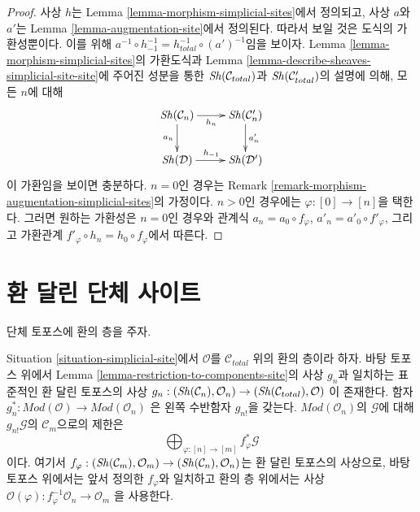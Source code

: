 \begin{proof}
사상 $h$는 Lemma \ref{lemma-morphism-simplicial-sites}에서 정의되고,
사상 $a$와 $a'$는 Lemma \ref{lemma-augmentation-site}에서 정의된다.
따라서 보일 것은 도식의 가환성뿐이다. 이를 위해
$a^{-1} \circ h_{-1}^{-1} = h_{total}^{-1} \circ (a')^{-1}$임을 보이자.
Lemma \ref{lemma-morphism-simplicial-sites}의 가환도식과 Lemma
\ref{lemma-describe-sheaves-simplicial-site-site}에 주어진 성분을 통한
$\mathop{\mathit{Sh}}\nolimits(\mathcal{C}_{total})$과 $\mathop{\mathit{Sh}}\nolimits(\mathcal{C}'_{total})$의 설명에 의해,
모든 $n$에 대해
$$
\xymatrix{
\Sh(\mathcal{C}_n) \ar[d]_{a_n} \ar[r]_{h_n} &
\Sh(\mathcal{C}'_n) \ar[d]^{a'_n} \\
\Sh(\mathcal{D}) \ar[r]^{h_{-1}} &
\Sh(\mathcal{D}')
}
$$
이 가환임을 보이면 충분하다. $n = 0$인 경우는 Remark
\ref{remark-morphism-augmentation-simplicial-sites}의 가정이다.
$n > 0$인 경우에는 $\varphi : [0] \to [n]$을 택한다. 그러면 원하는 가환성은
$n = 0$인 경우와 관계식 $a_n = a_0 \circ f_\varphi$,
$a'_n = a'_0 \circ f'_\varphi$, 그리고 가환관계
$f'_\varphi \circ h_n = h_0 \circ f_\varphi$에서 따른다.
\end{proof}


\section{환 달린 단체 사이트}
\label{section-simplicial-sites-modules}

\noindent
단체 토포스에 환의 층을 주자.

\begin{lemma}
\label{lemma-restriction-module-to-components-site}
Situation \ref{situation-simplicial-site}에서 $\mathcal{O}$를
$\mathcal{C}_{total}$ 위의 환의 층이라 하자.
바탕 토포스 위에서 Lemma \ref{lemma-restriction-to-components-site}의
사상 $g_n$과 일치하는 표준적인 환 달린 토포스의 사상
$g_n : (\mathop{\mathit{Sh}}\nolimits(\mathcal{C}_n), \mathcal{O}_n) \to
(\mathop{\mathit{Sh}}\nolimits(\mathcal{C}_{total}), \mathcal{O})$
이 존재한다. 함자
$g_n^* : \textit{Mod}(\mathcal{O}) \to \textit{Mod}(\mathcal{O}_n)$
은 왼쪽 수반함자 $g_{n!}$을 갖는다.
$\textit{Mod}(\mathcal{O}_n)$의 $\mathcal{G}$에 대해
$g_{n!}\mathcal{G}$의 $\mathcal{C}_m$으로의 제한은
$$
\bigoplus\nolimits_{\varphi : [n] \to [m]} f_\varphi^*\mathcal{G}
$$
이다. 여기서
$f_\varphi : (\mathop{\mathit{Sh}}\nolimits(\mathcal{C}_m), \mathcal{O}_m) \to
(\mathop{\mathit{Sh}}\nolimits(\mathcal{C}_n), \mathcal{O}_n)$는 환 달린 토포스의 사상으로,
바탕 토포스 위에서는 앞서 정의한 $f_\varphi$와 일치하고 환의 층 위에서는
사상 $\mathcal{O}(\varphi) : f_\varphi^{-1}\mathcal{O}_n \to \mathcal{O}_m$
을 사용한다.
\end{lemma}


